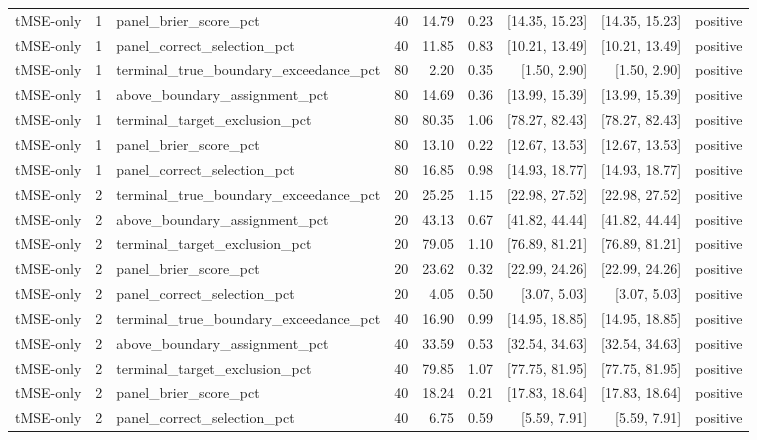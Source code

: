 \begin{longtable}{lllrrrrrl}
tMSE-only & 1 & panel\_brier\_score\_pct & 40 & 14.79 & 0.23 & [14.35, 15.23] & [14.35, 15.23] & positive \\
tMSE-only & 1 & panel\_correct\_selection\_pct & 40 & 11.85 & 0.83 & [10.21, 13.49] & [10.21, 13.49] & positive \\
tMSE-only & 1 & terminal\_true\_boundary\_exceedance\_pct & 80 & 2.20 & 0.35 & [1.50, 2.90] & [1.50, 2.90] & positive \\
tMSE-only & 1 & above\_boundary\_assignment\_pct & 80 & 14.69 & 0.36 & [13.99, 15.39] & [13.99, 15.39] & positive \\
tMSE-only & 1 & terminal\_target\_exclusion\_pct & 80 & 80.35 & 1.06 & [78.27, 82.43] & [78.27, 82.43] & positive \\
tMSE-only & 1 & panel\_brier\_score\_pct & 80 & 13.10 & 0.22 & [12.67, 13.53] & [12.67, 13.53] & positive \\
tMSE-only & 1 & panel\_correct\_selection\_pct & 80 & 16.85 & 0.98 & [14.93, 18.77] & [14.93, 18.77] & positive \\
tMSE-only & 2 & terminal\_true\_boundary\_exceedance\_pct & 20 & 25.25 & 1.15 & [22.98, 27.52] & [22.98, 27.52] & positive \\
tMSE-only & 2 & above\_boundary\_assignment\_pct & 20 & 43.13 & 0.67 & [41.82, 44.44] & [41.82, 44.44] & positive \\
tMSE-only & 2 & terminal\_target\_exclusion\_pct & 20 & 79.05 & 1.10 & [76.89, 81.21] & [76.89, 81.21] & positive \\
tMSE-only & 2 & panel\_brier\_score\_pct & 20 & 23.62 & 0.32 & [22.99, 24.26] & [22.99, 24.26] & positive \\
tMSE-only & 2 & panel\_correct\_selection\_pct & 20 & 4.05 & 0.50 & [3.07, 5.03] & [3.07, 5.03] & positive \\
tMSE-only & 2 & terminal\_true\_boundary\_exceedance\_pct & 40 & 16.90 & 0.99 & [14.95, 18.85] & [14.95, 18.85] & positive \\
tMSE-only & 2 & above\_boundary\_assignment\_pct & 40 & 33.59 & 0.53 & [32.54, 34.63] & [32.54, 34.63] & positive \\
tMSE-only & 2 & terminal\_target\_exclusion\_pct & 40 & 79.85 & 1.07 & [77.75, 81.95] & [77.75, 81.95] & positive \\
tMSE-only & 2 & panel\_brier\_score\_pct & 40 & 18.24 & 0.21 & [17.83, 18.64] & [17.83, 18.64] & positive \\
tMSE-only & 2 & panel\_correct\_selection\_pct & 40 & 6.75 & 0.59 & [5.59, 7.91] & [5.59, 7.91] & positive \\

\end{longtable}
